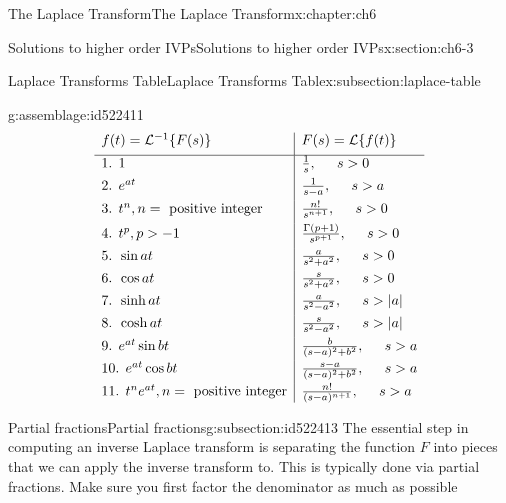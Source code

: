 \documentclass[oneside,10pt,]{book}
\numberwithin{equation}{section}
\newcommand{\abs}[1]{\left\vert#1\right\vert}
\newcommand{\inv}{^{-1}}
\numberwithin{equation}{section}
\newcommand{\amp}{&}
\begin{document}
\begin{chapterptx}{The Laplace Transform}{}{The Laplace Transform}{}{}{x:chapter:ch6}
\begin{sectionptx}{Solutions to higher order IVPs}{}{Solutions to higher order IVPs}{}{}{x:section:ch6-3}
\begin{subsectionptx}{Laplace Transforms Table}{}{Laplace Transforms Table}{}{}{x:subsection:laplace-table}
\begin{assemblage}{}{g:assemblage:id522411}
\begin{equation*}
\begin{array}{l|l}
f(t) = \mathcal{L}\inv\{F(s)\} \amp F(s) = \mathcal{L}\{f(t)\} \\[4pt] \hline
\text{1. } 1 \amp \frac{1}{s}, \hspace{.2in} s > 0 \\[4pt]
\text{2. } e^{at} \amp \frac{1}{s-a}, \hspace{.2in} s > a \\[4pt]
\text{3. } t^n, n=\text{ positive integer} \amp \frac{n!}{s^{n+1}}, \hspace{.2in} s > 0 \\[4pt]
\text{4. } t^p, p > -1 \amp \frac{\Gamma(p+1)}{s^{p+1}}, \hspace{.2in} s > 0 \\[4pt]
\text{5. } \sin at \amp \frac{a}{s^2 + a^2}, \hspace{.2in} s > 0 \\[4pt]
\text{6. } \cos at \amp \frac{s}{s^2 + a^2}, \hspace{.2in} s > 0 \\[4pt]
\text{7. } \sinh at \amp \frac{a}{s^2 - a^2}, \hspace{.2in} s > \abs{a} \\[4pt]
\text{8. } \cosh at \amp \frac{s}{s^2 - a^2}, \hspace{.2in} s > \abs{a} \\[4pt]
\text{9. } e^{at} \sin bt \amp \frac{b}{(s-a)^2 + b^2}, \hspace{.2in} s > a\\[4pt]
\text{10. } e^{at} \cos bt \amp \frac{s - a}{(s-a)^2 + b^2}, \hspace{.2in} s > a \\[4pt]
\text{11. } t^n e^{at}, n=\text{ positive integer} \amp \frac{n!}{(s-a)^{n+1}}, \hspace{.2in} s > a
\end{array}
\end{equation*}
%
\end{assemblage}
\end{subsectionptx}
%
%
\typeout{************************************************}
\typeout{************************************************}
%
\begin{subsectionptx}{Partial fractions}{}{Partial fractions}{}{}{g:subsection:id522413}
The essential step in computing an inverse Laplace transform is separating the function \(F\) into pieces that we can apply the inverse transform to. This is typically done via partial fractions. Make sure you first factor the denominator as much as possible%

\end{subsectionptx}
\end{sectionptx}
\end{chapterptx}
\end{document}
